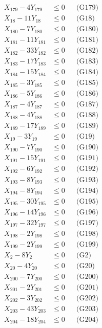 \documentclass[a4paper,10pt]{article}
\begin{document}
{\begin{align}
X_{179} - 4Y_{179} &\leq 0 && \text{(G179)} \\
X_{18} - 11Y_{18} &\leq 0 && \text{(G18)} \\
X_{180} - 7Y_{180} &\leq 0 && \text{(G180)} \\
X_{181} - 11Y_{181} &\leq 0 && \text{(G181)} \\
X_{182} - 33Y_{182} &\leq 0 && \text{(G182)} \\
X_{183} - 17Y_{183} &\leq 0 && \text{(G183)} \\
X_{184} - 15Y_{184} &\leq 0 && \text{(G184)} \\
X_{185} - 3Y_{185} &\leq 0 && \text{(G185)} \\
X_{186} - 5Y_{186} &\leq 0 && \text{(G186)} \\
X_{187} - 4Y_{187} &\leq 0 && \text{(G187)} \\
X_{188} - 4Y_{188} &\leq 0 && \text{(G188)} \\
\allowbreak
X_{189} - 17Y_{189} &\leq 0 && \text{(G189)} \\
X_{19} - 3Y_{19} &\leq 0 && \text{(G19)} \\
X_{190} - 7Y_{190} &\leq 0 && \text{(G190)} \\
X_{191} - 15Y_{191} &\leq 0 && \text{(G191)} \\
X_{192} - 6Y_{192} &\leq 0 && \text{(G192)} \\
X_{193} - 8Y_{193} &\leq 0 && \text{(G193)} \\
X_{194} - 8Y_{194} &\leq 0 && \text{(G194)} \\
X_{195} - 30Y_{195} &\leq 0 && \text{(G195)} \\
X_{196} - 14Y_{196} &\leq 0 && \text{(G196)} \\
X_{197} - 32Y_{197} &\leq 0 && \text{(G197)} \\
X_{198} - 2Y_{198} &\leq 0 && \text{(G198)} \\
X_{199} - 2Y_{199} &\leq 0 && \text{(G199)} \\
X_{2} - 8Y_{2} &\leq 0 && \text{(G2)} \\
X_{20} - 4Y_{20} &\leq 0 && \text{(G20)} \\
X_{200} - 7Y_{200} &\leq 0 && \text{(G200)} \\
X_{201} - 2Y_{201} &\leq 0 && \text{(G201)} \\
X_{202} - 3Y_{202} &\leq 0 && \text{(G202)} \\
X_{203} - 43Y_{203} &\leq 0 && \text{(G203)} \\
X_{204} - 18Y_{204} &\leq 0 && \text{(G204)} \\

\end{align}}
\end{document}
